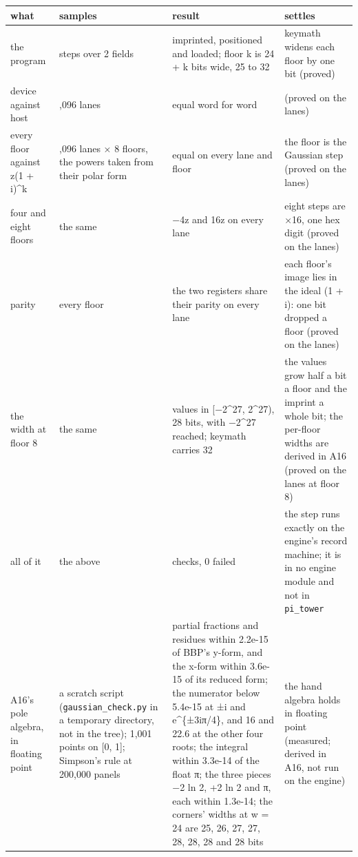 {\footnotesize
\setlength{\tabcolsep}{6pt}
\begin{longtable}{>{\RaggedRight\arraybackslash}p{}>{\RaggedRight\arraybackslash}p{}>{\RaggedRight\arraybackslash}p{}>{\RaggedRight\arraybackslash}p{}}
\toprule
what & samples & result & settles \\
\midrule
\endhead
the program & 18 steps over 2 fields & imprinted, positioned and loaded; floor k is 24 + k bits wide, 25 to 32 & keymath widens each floor by one bit (proved) \\
device against host & 4,096 lanes & equal word for word & (proved on the lanes) \\
every floor against z(1 + i)\textasciicircum{}k & 4,096 lanes × 8 floors, the powers taken from their polar form & equal on every lane and floor & the floor is the Gaussian step (proved on the lanes) \\
four and eight floors & the same & −4z and 16z on every lane & eight steps are ×16, one hex digit (proved on the lanes) \\
parity & every floor & the two registers share their parity on every lane & each floor's image lies in the ideal (1 + i): one bit dropped a floor (proved on the lanes) \\
the width at floor 8 & the same & values in [−2\textasciicircum{}27, 2\textasciicircum{}27), 28 bits, with −2\textasciicircum{}27 reached; keymath carries 32 & the values grow half a bit a floor and the imprint a whole bit; the per-floor widths are derived in A16 (proved on the lanes at floor 8) \\
all of it & the above & 8 checks, 0 failed & the step runs exactly on the engine's record machine; it is in no engine module and not in \texttt{pi\_\allowbreak{}tower} \\
A16's pole algebra, in floating point & a scratch script (\texttt{gaussian\_\allowbreak{}check.\allowbreak{}py} in a temporary directory, not in the tree); 1,001 points on [0, 1]; Simpson's rule at 200,000 panels & partial fractions and residues within 2.2e-15 of BBP's y-form, and the x-form within 3.6e-15 of its reduced form; the numerator below 5.4e-15 at ±i and e\textasciicircum{}\{±3iπ/4\}, and 16 and 22.6 at the other four roots; the integral within 3.3e-14 of the float π; the three pieces −2 ln 2, +2 ln 2 and π, each within 1.3e-14; the corners' widths at w = 24 are 25, 26, 27, 27, 28, 28, 28 and 28 bits & the hand algebra holds in floating point (measured; derived in A16, not run on the engine) \\
\bottomrule
\end{longtable}
}

